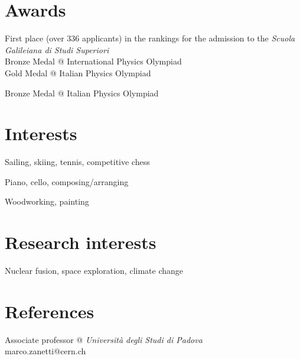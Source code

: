 \documentclass[11pt, a4 paper]{article}
\begin{document}
\section*{Awards}
  \begin{description}[style=multiline,leftmargin=3cm,align=right]
    \item[2016]
      First place (over 336 applicants) in the rankings for the admission to the \emph{Scuola Galileiana di Studi Superiori} \\
      Bronze Medal @ International Physics Olympiad \\
      Gold Medal @ Italian Physics Olympiad
    \item[2015] Bronze Medal @ Italian Physics Olympiad
  \end{description}


\section*{Interests}
  \begin{description}[style=multiline,leftmargin=3cm,align=right]
    \item[Sports] Sailing, skiing, tennis, competitive chess
    \item[Music] Piano, cello, composing/arranging
    \item[Other] Woodworking, painting
  \end{description}


\section*{Research interests}
  \begin{description}[style=multiline,leftmargin=3cm,align=right]
    \item[] Nuclear fusion, space exploration, climate change
  \end{description}


\section*{References}
\begin{description}[style=multiline,leftmargin=3cm,align=right]
  \item[Marco Zanetti]
    Associate professor @ \emph{Università degli Studi di Padova} \\
    marco.zanetti@cern.ch
\end{description}
\end{document}
